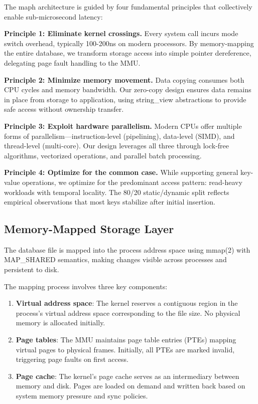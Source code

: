 \documentclass[11pt]{article}
\begin{document}
The maph architecture is guided by four fundamental principles that collectively enable sub-microsecond latency:

\textbf{Principle 1: Eliminate kernel crossings.} Every system call incurs mode switch overhead, typically 100-200ns on modern processors. By memory-mapping the entire database, we transform storage access into simple pointer dereference, delegating page fault handling to the MMU.

\textbf{Principle 2: Minimize memory movement.} Data copying consumes both CPU cycles and memory bandwidth. Our zero-copy design ensures data remains in place from storage to application, using string\_view abstractions to provide safe access without ownership transfer.

\textbf{Principle 3: Exploit hardware parallelism.} Modern CPUs offer multiple forms of parallelism—instruction-level (pipelining), data-level (SIMD), and thread-level (multi-core). Our design leverages all three through lock-free algorithms, vectorized operations, and parallel batch processing.

\textbf{Principle 4: Optimize for the common case.} While supporting general key-value operations, we optimize for the predominant access pattern: read-heavy workloads with temporal locality. The 80/20 static/dynamic split reflects empirical observations that most keys stabilize after initial insertion.

\subsection{Memory-Mapped Storage Layer}

The database file is mapped into the process address space using mmap(2) with MAP\_SHARED semantics, making changes visible across processes and persistent to disk.

The mapping process involves three key components:

\begin{enumerate}
\item \textbf{Virtual address space}: The kernel reserves a contiguous region in the process's virtual address space corresponding to the file size. No physical memory is allocated initially.

\item \textbf{Page tables}: The MMU maintains page table entries (PTEs) mapping virtual pages to physical frames. Initially, all PTEs are marked invalid, triggering page faults on first access.

\item \textbf{Page cache}: The kernel's page cache serves as an intermediary between memory and disk. Pages are loaded on demand and written back based on system memory pressure and sync policies.
\end{enumerate}
\end{document}
